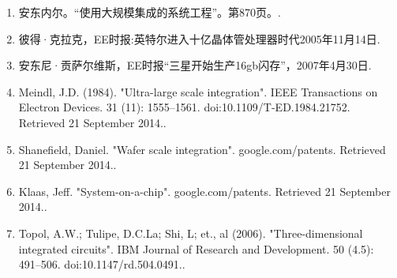 \begin{enumerate}
\item 安东内尔。“使用大规模集成的系统工程”。第870页。.
\item 彼得·克拉克，EE时报:英特尔进入十亿晶体管处理器时代2005年11月14日.
\item 安东尼·贡萨尔维斯，EE时报“三星开始生产16gb闪存”，2007年4月30日.
\item Meindl, J.D. (1984). "Ultra-large scale integration". IEEE Transactions on Electron Devices. 31 (11): 1555–1561. doi:10.1109/T-ED.1984.21752. Retrieved 21 September 2014..
\item Shanefield, Daniel. "Wafer scale integration". google.com/patents. Retrieved 21 September 2014..
\item Klaas, Jeff. "System-on-a-chip". google.com/patents. Retrieved 21 September 2014..
\item Topol, A.W.; Tulipe, D.C.La; Shi, L; et., al (2006). "Three-dimensional integrated circuits". IBM Journal of Research and Development. 50 (4.5): 491–506. doi:10.1147/rd.504.0491..
\end{enumerate}
